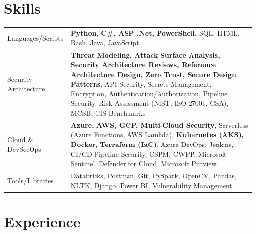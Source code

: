 \documentclass[a4paper,3pt]{article}
\begin{document}
\section{Skills}
\begin{tabularx}{\linewidth}{@{}l X@{}}
    Languages/Scripts      & \normalsize{\textbf{Python, C\#, ASP .Net, PowerShell,} SQL, HTML, Bash, Java, JavaScript}\\
    Security Architecture  & \normalsize{\textbf{Threat Modeling, Attack Surface Analysis, Security Architecture Reviews, Reference Architecture Design, Zero Trust, Secure Design Patterns}, API Security, Secrets Management, Encryption, Authentication/Authorization, Pipeline Security, Risk Assessment (NIST, ISO 27001, CSA), MCSB, CIS Benchmarks}\\
    Cloud \& DevSecOps     & \normalsize{\textbf{Azure, AWS, GCP, Multi-Cloud Security}, Serverless (Azure Functions, AWS Lambda), \textbf{Kubernetes (AKS), Docker, Terraform (IaC)}, Azure DevOps, Jenkins, CI/CD Pipeline Security, CSPM, CWPP, Microsoft Sentinel, Defender for Cloud, Microsoft Purview}\\
    Tools/Libraries        & \normalsize{Databricks, Postman, Git, PySpark, OpenCV, Pandas, NLTK, Django, Power BI, Vulnerability Management}
\end{tabularx}


\section{Experience}
\end{document}
